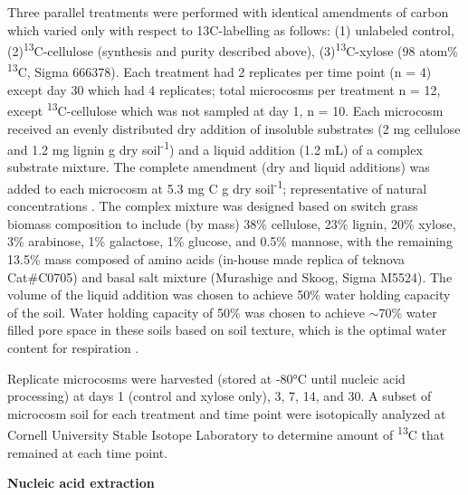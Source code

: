 Three parallel treatments were performed with identical amendments of carbon which varied only with respect to 13C-labelling as follows: (1) unlabeled control,(2)\textsuperscript{13}C-cellulose (synthesis and purity described above), (3)\textsuperscript{13}C-xylose (98 atom\% \textsuperscript{13}C, Sigma 666378). Each treatment had 2 replicates per time point (n = 4) except day 30 which had 4 replicates; total microcosms per treatment n = 12, except \textsuperscript{13}C-cellulose which was not sampled at day 1, n = 10. Each microcosm received an evenly distributed dry addition of insoluble substrates (2 mg cellulose and 1.2 mg lignin g dry soil\textsuperscript{-1}) and a liquid addition (1.2 mL) of a complex substrate mixture. The complete amendment (dry and liquid additions) was added to each microcosm at 5.3 mg C g dry soil\textsuperscript{-1}; representative of natural concentrations \cite{Schneckenberger_2008}. The complex mixture was designed based on switch grass biomass composition \cite{Yan_2010,David_2010} to include (by mass) 38\% cellulose, 23\% lignin, 20\% xylose, 3\% arabinose, 1\% galactose, 1\% glucose, and 0.5\% mannose, with the remaining 13.5\% mass composed of amino acids (in-house made replica of teknova Cat#C0705) and basal salt mixture (Murashige and Skoog, Sigma M5524). The volume of the liquid addition was chosen to achieve 50\% water holding capacity of the soil. Water holding capacity of 50\% was chosen to achieve $\sim$70\% water filled pore space in these soils based on soil texture, which is the optimal water content for respiration \cite{Linn_1984,Linn_1984}.

Replicate microcosms were harvested (stored at -80°C until nucleic acid processing) at days 1 (control and xylose only), 3, 7, 14, and 30. A subset of microcosm soil for each treatment and time point were isotopically analyzed at Cornell University Stable Isotope Laboratory to determine amount of \textsuperscript{13}C that remained at each time point.   

\textbf{Nucleic acid extraction}

